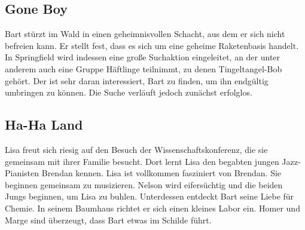 
\subsection{Gone Boy}\label{XABF02}
Bart stürzt im Wald in einen geheimnisvollen Schacht, aus dem er sich nicht befreien kann. Er stellt fest, dass es sich um eine geheime Raketenbasis handelt. In Springfield wird indessen eine große Suchaktion eingeleitet, an der unter anderem auch eine Gruppe Häftlinge teilnimmt, zu denen Tingeltangel-Bob gehört. Der ist sehr daran interessiert, Bart zu finden, um ihn endgültig umbringen zu können. Die Suche verläuft jedoch zunächst erfolglos.


\subsection{Ha-Ha Land}
Lisa freut sich riesig auf den Besuch der Wissenschaftskonferenz, die sie gemeinsam mit ihrer Familie besucht. Dort lernt Lisa den begabten jungen Jazz-Pianisten Brendan kennen. Lisa ist vollkommen fasziniert von Brendan. Sie beginnen gemeinsam zu musizieren. Nelson wird eifersüchtig und die beiden Jungs beginnen, um Lisa zu buhlen. Unterdessen entdeckt Bart seine Liebe für Chemie. In seinem Baumhaus richtet er sich einen kleines Labor ein. Homer und Marge sind überzeugt, dass Bart etwas im Schilde führt. 


